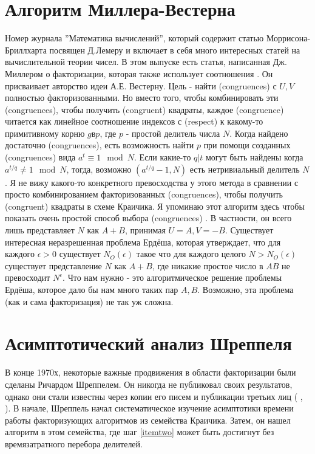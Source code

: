 \documentclass[russian, utf8, a4paper,12pt]{report}
\begin{document}
\section{Алгоритм Миллера-Вестерна}
Номер журнала ''Математика вычислений'', который содержит статью Моррисона-Бриллхарта посвящен Д.Лемеру и включает в себя много интересных статей на вычислительной теории чисел. В этом выпуске есть статья, написанная Дж. Миллером \cite{miller} о факторизации, которая также использует соотношения \sus . Он присваивает авторство идеи А.Е. Вестерну. Цель - найти (congruences) с $U, V$ полностью факторизованными. Но вместо того, чтобы комбинировать эти (congruences), чтобы получить (congruent) квадраты, каждое (congruence) читается как линейное соотношение индексов с (respect) к какому-то примитивному корню $g в p$, где $p$ - простой делитель числа $N$. Когда найдено достаточно (congruences), есть возможность найти $p$ при помощи созданных (congruences) вида $a^t \equiv 1 \mod N$. Если какие-то $q|t$ могут быть найдены когда $a^{t/q} \neq 1 \mod N$, тогда, возможно $(a^{t/q}-1, N)$ есть нетривиальный делитель $N$.
Я не вижу какого-то конкретного превосходства у этого метода в сравнении с просто комбинированием факторизованных (congruences), чтобы получить (congruent) квадраты в схеме Краичика. Я упоминаю этот алгоритм здесь чтобы показать очень простой способ выбора (congruences) \sus . В частности, он всего лишь представляет $N$ как $A+B$, принимая $U = A, V = -B$. Существует интересная неразрешенная проблема Ердёша, которая утверждает, что для каждого $\epsilon > 0$ существует $N_{O}(\epsilon)$ такое что для каждого целого $N > N_{O}(\epsilon)$ существует представление $N$ как $A+B$, где никакие простое число в $AB$ не превосходит $N^{\epsilon}$. Что нам нужно - это алгоритмическое решение проблемы Ердёша, которое дало бы нам много таких пар $A, B$. Возможно, эта проблема (как и сама факторизация) не так уж сложна.

\section{Асимптотический анализ Шреппеля}
В конце 1970х, некоторые важные продвижения в области факторизации были сделаны Ричардом Шреппелем. Он никогда не публиковал своих результатов, однако они стали известны через копии его писем и публикации третьих лиц ( \cite{monier}, \cite{pomer}). В начале, Шреппель начал систематическое изучение асимптотики времени работы факторизующих алгоритмов из семейства Краичика. Затем, он нашел алгоритм в этом семейства, где шаг \ref{itemtwo} может быть достигнут без времязатратного перебора делителей.
\end{document}
